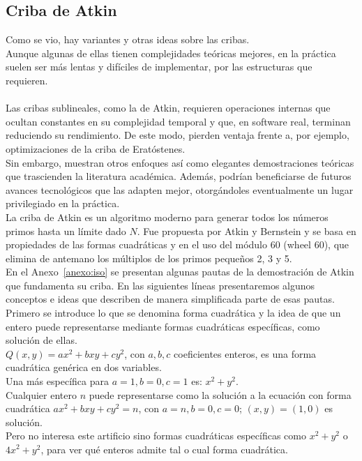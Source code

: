 \subsection{Criba de Atkin}
Como se vio, hay variantes y otras ideas sobre las cribas.\\
Aunque algunas de ellas tienen complejidades teóricas mejores, en la práctica suelen ser más lentas y difíciles de implementar, por las estructuras que requieren. \\ \\
Las cribas sublineales, como la de Atkin, requieren
operaciones internas que ocultan constantes en su complejidad temporal y que, en software real, terminan reduciendo su rendimiento. De este modo, pierden ventaja frente a, por ejemplo,  optimizaciones de la criba de Eratóstenes. \\
Sin embargo, muestran otros enfoques así como elegantes demostraciones teóricas que trascienden la literatura académica. Además, podrían beneficiarse de futuros avances tecnológicos que las adapten mejor, otorgándoles eventualmente un lugar privilegiado en la práctica. \\

La criba de Atkin \cite{AtkinBernstein2004} es un algoritmo moderno para generar todos los números primos hasta un límite dado $N$. Fue propuesta por Atkin y Bernstein y se basa en propiedades de las formas cuadráticas y en el uso del módulo 60 (wheel 60), que elimina de antemano los múltiplos de los primos pequeños 2, 3 y 5. \\

En el Anexo~\ref{anexo:iso} se presentan algunas pautas de la demostración de Atkin que fundamenta su criba. En las siguientes líneas presentaremos algunos conceptos e ideas que describen de manera simplificada parte de esas pautas. \\
Primero se introduce lo que se denomina forma cuadrática y la idea de que un entero puede representarse mediante formas cuadráticas específicas, como solución de ellas. \\

$Q(x,y) = ax^2 + bxy + cy^2$, con $a,b,c$ coeficientes
enteros, es una forma cuadrática genérica en dos variables. \\
Una más específica para $a=1, b=0, c=1$ es: $x^2+y^2$. \\

Cualquier entero $n$ puede representarse como la solución a la
ecuación con forma cuadrática $ax^{2} + bxy + cy^{2} = n$, con
$a = n,b = 0,c = 0$; $(x,y) = (1,0)$ es solución. \\
Pero no interesa este artificio sino formas cuadráticas específicas como $x^{2} + y^{2}$ o ${4x}^{2} + y^{2}$, para ver qué enteros admite tal o cual forma cuadrática. \\

